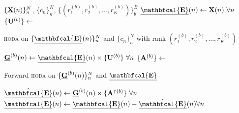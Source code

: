 \begin{algorithmic}[1]
  \Require $\{\underline{\mathbf{X}}(n)\}_n^N$, $\{c_n\}_n^N$,
  $\{(r_1^{(b)},r_2^{(b)},\ldots,r_K^{(b)})\}_b^B$
  \State $\ten{\mathbfcal{E}}(n)\gets\ten{X}(n)\ \forall n$
  \State $\{\mathbf{U}^{(b)}\}\gets$ \parbox[t]{5cm}{\textsc{hoda} on $\{\ten{\mathbfcal{E}}(n)\}_n^N$ and
  $\{c_n\}_n^N$ with rank $(r_1^{(b)},r_2^{(b)},\ldots,r_K^{(b)})$}
  \State $\ten{G}^{(b)}(n)\gets\ten{\mathbfcal{E}}(n)\mmpri{\mat{U}^{(b)}}\
  \forall n$
  \State $\{\mathbf{A}^{(b)}\}\gets$ \parbox[t]{5cm}{Forward \textsc{hoda} on
  $\{\underline{\mathbf{G}}^{(b)}(n)\}_n^N$ and $\ten{\mathbfcal{E}}$}
  \State
  $\hat{\ten{\mathbfcal{E}}}(n)\gets\ten{G}^{(b)}(n)\mmpri{\mat{A}^{\intercal(b)}}\
  \forall n$
  \State
  $\ten{\mathbfcal{E}}(n)\gets \ten{\mathbfcal{E}}(n) - \hat{\ten{\mathbfcal{E}}}(n) \forall n$

  \EndFor
\end{algorithmic}
